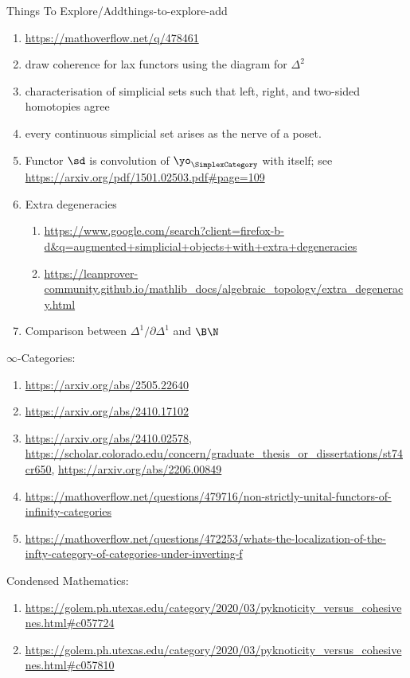 \begin{remark}{Things To Explore/Add}{things-to-explore-add}
\begin{enumerate}
        \item \url{https://mathoverflow.net/q/478461}
        \item draw coherence for lax functors using the diagram for $\Delta^{2}$
        \item characterisation of simplicial sets such that left, right, and two-sided homotopies agree
        \item every continuous simplicial set arises as the nerve of a poset.
        \item Functor $\sd$ is convolution of $\yo_{\SimplexCategory}$ with itself; see \url{https://arxiv.org/pdf/1501.02503.pdf#page=109}
        \item Extra degeneracies
            \begin{enumerate}
                \item \url{https://www.google.com/search?client=firefox-b-d&q=augmented+simplicial+objects+with+extra+degeneracies}
                \item \url{https://leanprover-community.github.io/mathlib_docs/algebraic_topology/extra_degeneracy.html}
            \end{enumerate}
        \item Comparison between $\Delta^{1}/\partial\Delta^{1}$ and $\B\N$
    \end{enumerate}
    $\infty$-Categories:
    \begin{enumerate}
        \item \url{https://arxiv.org/abs/2505.22640}
        \item \url{https://arxiv.org/abs/2410.17102}
        \item \url{https://arxiv.org/abs/2410.02578}, \url{https://scholar.colorado.edu/concern/graduate_thesis_or_dissertations/st74cr650}, \url{https://arxiv.org/abs/2206.00849}
        \item \url{https://mathoverflow.net/questions/479716/non-strictly-unital-functors-of-infinity-categories}
        \item \url{https://mathoverflow.net/questions/472253/whats-the-localization-of-the-infty-category-of-categories-under-inverting-f}
    \end{enumerate}
    Condensed Mathematics:
    \begin{enumerate}
        \item \url{https://golem.ph.utexas.edu/category/2020/03/pyknoticity_versus_cohesivenes.html#c057724}
        \item \url{https://golem.ph.utexas.edu/category/2020/03/pyknoticity_versus_cohesivenes.html#c057810}

\end{enumerate}
\end{remark}
